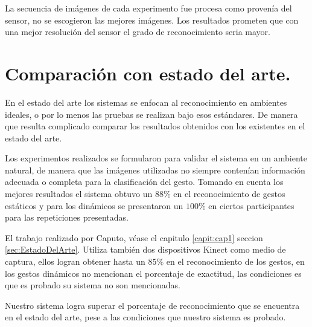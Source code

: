 La secuencia de imágenes de cada experimento fue procesa como provenía del sensor, no se escogieron las mejores imágenes. Los resultados prometen que con una mejor resolución del sensor el grado de reconocimiento seria mayor. 

\section{Comparación con estado del arte.}  

En el estado del arte los sistemas se enfocan al reconocimiento en ambientes ideales, o por lo menos las pruebas se realizan bajo esos estándares. De manera que resulta complicado comparar los resultados obtenidos con los existentes en el estado del arte.

Los experimentos realizados se formularon para validar el sistema en un ambiente natural, de manera que las imágenes utilizadas no siempre contenían información adecuada o completa para la clasificación del gesto. Tomando en cuenta los mejores resultados el sistema obtuvo un $88 \%$ en el reconocimiento de gestos estáticos y para los dinámicos se presentaron un $100 \%$ en ciertos participantes para las repeticiones presentadas. 

El trabajo realizado por Caputo, véase el capitulo \ref{capit:cap1} seccion \ref{sec:EstadoDelArte}. Utiliza también dos dispositivos Kinect como medio de captura, ellos logran obtener hasta un $85 \%$ en el reconocimiento de los gestos, en los gestos dinámicos no mencionan el porcentaje de exactitud, las condiciones es que es probado su sistema no son mencionadas. 

Nuestro sistema logra superar el porcentaje de reconocimiento que se encuentra en el estado del arte, pese a las condiciones que nuestro sistema es probado.  


\newpage